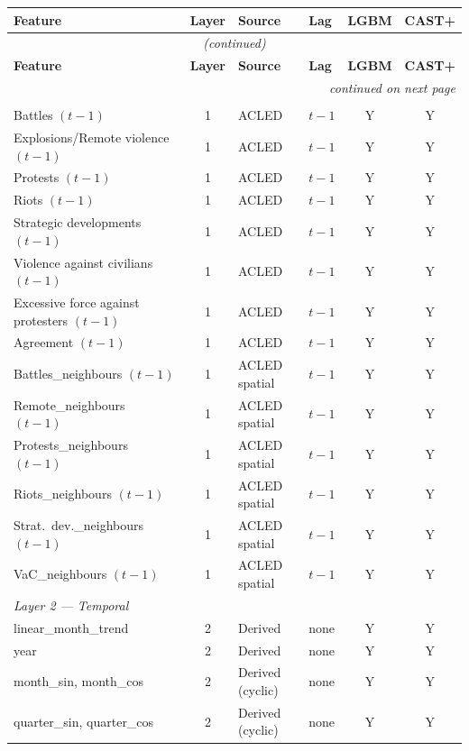\documentclass[12pt,a4paper]{article}
\begin{document}
\begin{longtable}{p{6.2cm} c p{3cm} l c c}
\toprule
\textbf{Feature} & \textbf{Layer} & \textbf{Source} & \textbf{Lag} & \textbf{LGBM} & \textbf{CAST+} \\
\midrule
\endfirsthead
\multicolumn{6}{c}{\textit{(continued)}} \\
\toprule
\textbf{Feature} & \textbf{Layer} & \textbf{Source} & \textbf{Lag} & \textbf{LGBM} & \textbf{CAST+} \\
\midrule
\endhead
\midrule \multicolumn{6}{r}{\textit{continued on next page}} \\
\endfoot
\bottomrule
\endlastfoot
\multicolumn{6}{l}{\textit{Layer 1 — ACLED Autoregressive}} \\
Battles $(t-1)$ & 1 & ACLED & $t-1$ & Y & Y \\
Explosions/Remote violence $(t-1)$ & 1 & ACLED & $t-1$ & Y & Y \\
Protests $(t-1)$ & 1 & ACLED & $t-1$ & Y & Y \\
Riots $(t-1)$ & 1 & ACLED & $t-1$ & Y & Y \\
Strategic developments $(t-1)$ & 1 & ACLED & $t-1$ & Y & Y \\
Violence against civilians $(t-1)$ & 1 & ACLED & $t-1$ & Y & Y \\
Excessive force against protesters $(t-1)$ & 1 & ACLED & $t-1$ & Y & Y \\
Agreement $(t-1)$ & 1 & ACLED & $t-1$ & Y & Y \\
Battles\_neighbours $(t-1)$ & 1 & ACLED spatial & $t-1$ & Y & Y \\
Remote\_neighbours $(t-1)$ & 1 & ACLED spatial & $t-1$ & Y & Y \\
Protests\_neighbours $(t-1)$ & 1 & ACLED spatial & $t-1$ & Y & Y \\
Riots\_neighbours $(t-1)$ & 1 & ACLED spatial & $t-1$ & Y & Y \\
Strat.\ dev.\_neighbours $(t-1)$ & 1 & ACLED spatial & $t-1$ & Y & Y \\
VaC\_neighbours $(t-1)$ & 1 & ACLED spatial & $t-1$ & Y & Y \\
\multicolumn{6}{l}{\textit{Layer 2 — Temporal}} \\
linear\_month\_trend & 2 & Derived & none & Y & Y \\
year & 2 & Derived & none & Y & Y \\
month\_sin, month\_cos & 2 & Derived (cyclic) & none & Y & Y \\
quarter\_sin, quarter\_cos & 2 & Derived (cyclic) & none & Y & Y \\

\end{longtable}
\end{document}
